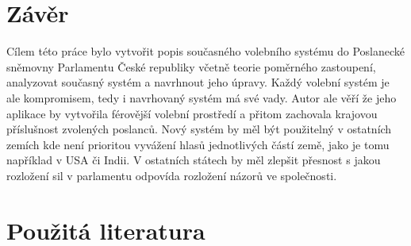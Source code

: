 \documentclass[12pt]{report}
\begin{document}
\section{Závěr} 
Cílem této práce bylo vytvořit popis současného volebního systému do Poslanecké sněmovny Parlamentu České republiky včetně teorie poměrného zastoupení, analyzovat současný systém a navrhnout jeho úpravy.
Každý volební systém je ale kompromisem, tedy i navrhovaný systém má své vady.
Autor ale věří že jeho aplikace by vytvořila férovější volební prostředí a přitom zachovala krajovou příslušnost zvolených poslanců.
Nový systém by měl být použitelný v ostatních zemích kde není prioritou vyvážení hlasů jednotlivých částí země, jako je tomu například v USA či Indii.
V ostatních státech by měl zlepšit přesnost s jakou rozložení sil v parlamentu odpovída rozložení názorů ve společnosti.
\section*{Použitá literatura}
\printbibliography[heading=none]
\end{document}

